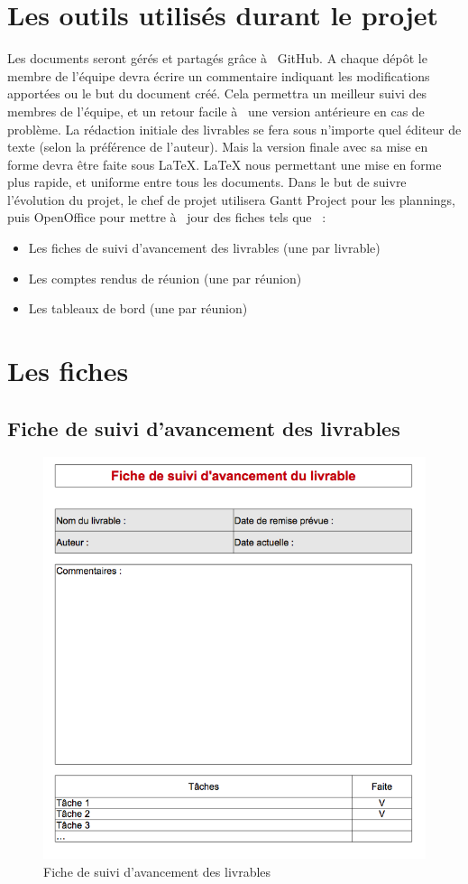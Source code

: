 \section{Les outils utilisés durant le projet}
    Les documents seront gérés et partagés grâce à  GitHub. A chaque dépôt le membre de l'équipe devra écrire un commentaire indiquant les modifications apportées ou le but du document créé. Cela permettra un meilleur suivi des membres de l'équipe, et un retour facile à  une version antérieure en cas de problème.
    La rédaction initiale des livrables se fera sous n'importe quel éditeur de texte (selon la préférence de l'auteur). Mais la version finale avec sa mise en forme devra être faite sous LaTeX. LaTeX nous permettant une mise en forme plus rapide, et uniforme entre tous les documents.
Dans le but de suivre l'évolution du projet, le chef de projet utilisera Gantt Project pour les plannings, puis OpenOffice pour mettre à  jour des fiches tels que  :
\begin{itemize}
    \item Les fiches de suivi d'avancement des livrables (une par livrable)
    \item Les comptes rendus de réunion (une par réunion)
    \item Les tableaux de bord (une par réunion)
\end{itemize}

\section{Les fiches}
\subsection{Fiche de suivi d'avancement des livrables}
\begin{figure}[h]
    \centering
    \includegraphics[width=140mm]{images/fiche_de_suivi_davancement_des_livrables.png}
    \caption{Fiche de suivi d'avancement des livrables}
\end{figure}
